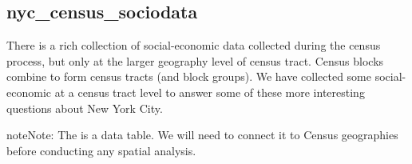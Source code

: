 \documentclass[a4paper,11pt,english]{sphinxmanual}
\begin{document}
\begin{figure}[htbp]
\centering
\capstart

\noindent{}
\caption{}\label{\detokenize{setup:id6}}\end{figure}


\subsection{nyc\_census\_sociodata}
\label{\detokenize{setup:nyc-census-sociodata}}
There is a rich collection of social-economic data collected during the census process, but only at the larger geography level of census tract.  Census blocks combine to form census tracts (and block groups). We have collected some social-economic at a census tract level to answer some of these more interesting questions about New York City.

\begin{sphinxadmonition}{note}{Note:}
The  is a data table.  We will need to connect it to Census geographies before conducting any spatial analysis.
\end{sphinxadmonition}
\end{document}

